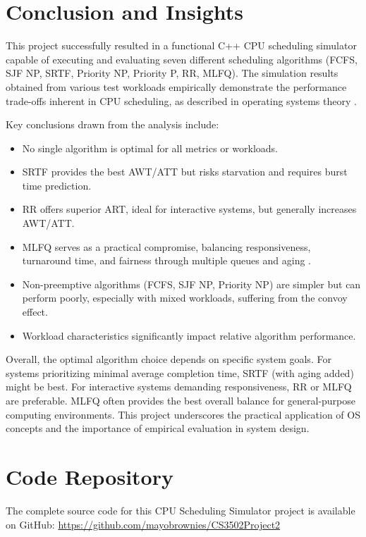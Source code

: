 \documentclass[12pt]{article}
\begin{document}
\section{Conclusion and Insights}
This project successfully resulted in a functional C++ CPU scheduling simulator capable of executing and evaluating seven different scheduling algorithms (FCFS, SJF NP, SRTF, Priority NP, Priority P, RR, MLFQ). The simulation results obtained from various test workloads empirically demonstrate the performance trade-offs inherent in CPU scheduling, as described in operating systems theory \citep{silberschatz2018operating}.

Key conclusions drawn from the analysis include:
\begin{itemize}
    \item No single algorithm is optimal for all metrics or workloads.
    \item SRTF provides the best AWT/ATT but risks starvation and requires burst time prediction.
    \item RR offers superior ART, ideal for interactive systems, but generally increases AWT/ATT.
    \item MLFQ serves as a practical compromise, balancing responsiveness, turnaround time, and fairness through multiple queues and aging \citep{nauer}.
    \item Non-preemptive algorithms (FCFS, SJF NP, Priority NP) are simpler but can perform poorly, especially with mixed workloads, suffering from the convoy effect.
    \item Workload characteristics significantly impact relative algorithm performance.
\end{itemize}

Overall, the optimal algorithm choice depends on specific system goals. For systems prioritizing minimal average completion time, SRTF (with aging added) might be best. For interactive systems demanding responsiveness, RR or MLFQ are preferable. MLFQ often provides the best overall balance for general-purpose computing environments. This project underscores the practical application of OS concepts and the importance of empirical evaluation in system design.

\section{Code Repository}
The complete source code for this CPU Scheduling Simulator project is available on GitHub:
\url{https://github.com/mayobrownies/CS3502Project2}

\newpage


\end{document}
